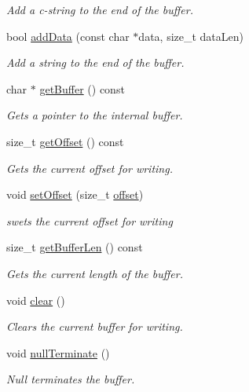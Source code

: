 \begin{DoxyCompactItemize}
\begin{DoxyCompactList}\small\item\em Add a c-\/string to the end of the buffer. \end{DoxyCompactList}\item 
bool \hyperlink{class_json_buffer_a760cb5be42ed2d2ca9306b1109e76af3}{add\+Data} (const char $\ast$data, size\+\_\+t data\+Len)
\begin{DoxyCompactList}\small\item\em Add a string to the end of the buffer. \end{DoxyCompactList}\item 
char $\ast$ \hyperlink{class_json_buffer_af8ca5014e0275487273f94c6b9223acf}{get\+Buffer} () const
\begin{DoxyCompactList}\small\item\em Gets a pointer to the internal buffer. \end{DoxyCompactList}\item 
size\+\_\+t \hyperlink{class_json_buffer_adedc049fc02ef5bad2b3f8e7a1ba17b6}{get\+Offset} () const
\begin{DoxyCompactList}\small\item\em Gets the current offset for writing. \end{DoxyCompactList}\item 
void \hyperlink{class_json_buffer_a0043413c56e23d83f3b4dbe508a35315}{set\+Offset} (size\+\_\+t \hyperlink{class_json_buffer_aeb1ab3291108f351834f2e8c6784538c}{offset})
\begin{DoxyCompactList}\small\item\em swets the current offset for writing \end{DoxyCompactList}\item 
size\+\_\+t \hyperlink{class_json_buffer_a486352be5658e94b9b9bd13563801e68}{get\+Buffer\+Len} () const
\begin{DoxyCompactList}\small\item\em Gets the current length of the buffer. \end{DoxyCompactList}\item 
void \hyperlink{class_json_buffer_a70969847d857815a9ded6450378e0e53}{clear} ()
\begin{DoxyCompactList}\small\item\em Clears the current buffer for writing. \end{DoxyCompactList}\item 
void \hyperlink{class_json_buffer_a9f649ceeed76bb798c0bf9792b56d743}{null\+Terminate} ()
\begin{DoxyCompactList}\small\item\em Null terminates the buffer. \end{DoxyCompactList}\end{DoxyCompactItemize}
